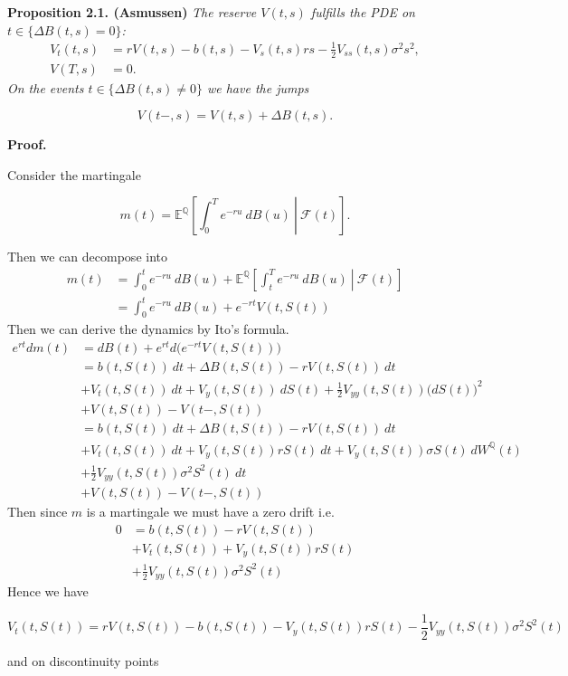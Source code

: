 \documentclass[a4paper,12pt,openany]{book}
\begin{document}
\textbf{Proposition 2.1. (Asmussen)} \emph{The reserve \(V(t,s)\) fulfills the PDE on \(t\in\{\Delta B(t,s)=0\}\):}
\begin{align*}
V_t(t,s)&=rV(t,s)-b(t,s)-V_s(t,s)rs-\frac{1}{2}V_{ss}(t,s)\sigma^2s^2,\\
V(T,s)&=0.
\end{align*}
\emph{On the events \(t\in \{\Delta B(t,s)\ne 0\}\) we have the jumps}

\[
V(t-,s)=V(t,s)+\Delta B(t,s).
\]

\textbf{Proof.}

Consider the martingale

\[
m(t)=\mathbb E^{\mathbb Q}\left[\left. \int_0^Te^{-ru}\ dB(u)\ \right\vert\ \mathcal F(t)\right].
\]

Then we can decompose into
\begin{align*}
m(t)&=\int_0^te^{-ru}\ dB(u)+\mathbb E^{\mathbb Q}\left[\left. \int_t^Te^{-ru}\ dB(u)\ \right\vert\ \mathcal F(t)\right]\\
&=\int_0^te^{-ru}\ dB(u)+e^{-rt}V(t,S(t))
\end{align*}
Then we can derive the dynamics by Ito's formula.
\begin{align*}
e^{rt}dm(t)&=dB(t)+e^{rt}d\Big(e^{-rt}V(t,S(t))\Big)\\
&=b(t,S(t))\ dt+\Delta B(t,S(t))-rV(t,S(t))\ dt\\
&+V_t(t,S(t))\ dt+V_y(t,S(t))\ dS(t)+\frac{1}{2}V_{yy}(t,S(t))\big(dS(t)\big)^2\\
&+V(t,S(t))-V(t-,S(t))\\
&=b(t,S(t))\ dt+\Delta B(t,S(t))-rV(t,S(t))\ dt\\
&+V_t(t,S(t))\ dt+V_y(t,S(t))rS(t)\ dt + V_y(t,S(t))\sigma S(t)\ dW^\mathbb Q(t)\\
&+\frac{1}{2}V_{yy}(t,S(t))\sigma^2S^2(t)\ dt\\
&+V(t,S(t))-V(t-,S(t))
\end{align*}
Then since \(m\) is a martingale we must have a zero drift i.e.
\begin{align*}
0&=b(t,S(t))-rV(t,S(t))\\
&+V_t(t,S(t))+V_y(t,S(t))rS(t)\\
&+\frac{1}{2}V_{yy}(t,S(t))\sigma^2S^2(t)
\end{align*}
Hence we have

\[
V_t(t,S(t))=rV(t,S(t))-b(t,S(t))-V_y(t,S(t))rS(t)-\frac{1}{2}V_{yy}(t,S(t))\sigma^2S^2(t)
\]

and on discontinuity points
\end{document}
